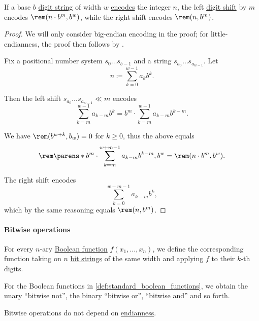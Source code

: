 \begin{proposition}\label{thm:digit_shift_arithmetic}
  If a base \( b \) \hyperref[def:positional_number_system]{digit string} of width \( w \) \hyperref[def:ring_of_unsigned_integers]{encodes} the integer \( n \), the left \hyperref[def:digit_shift]{digit shift} by \( m \) encodes \( \rem(n \cdot b^m, b^w) \), while the right shift encodes \( \rem(n, b^m) \).
\end{proposition}
\begin{proof}
  We will only consider big-endian encoding in the proof; for little-endianness, the proof then follows by .

  Fix a positional number system \( s_0 \ldots s_{b-1} \) and a string \( s_{a_0} \ldots s_{a_{w-1}} \). Let
  \begin{equation*}
    n \coloneqq \sum_{k=0}^{w-1} a_k b^k.
  \end{equation*}

  Then the left shift \( s_{a_0} \ldots s_{a_{w-1}} \ll m \) encodes
  \begin{equation*}
    \sum_{k=m}^{w-1} a_{k-m} b^k = b^m \cdot \sum_{k=m}^{w-1} a_{k-m} b^{k-m}.
  \end{equation*}

  We have \( \rem(b^{w+k}, b_w) = 0 \) for \( k \geq 0 \), thus the above equals
  \begin{equation*}
    \rem\parens*{ b^m \cdot \sum_{k=m}^{w+m-1} a_{k-m} b^{k-m}, b^w } = \rem(n \cdot b^m, b^w).
  \end{equation*}

  The right shift encodes
  \begin{equation*}
    \sum_{k=0}^{w-m-1} a_{k-m} b^k,
  \end{equation*}
  which by the same reasoning equals \( \rem(n, b^m) \).
\end{proof}

\paragraph{Bitwise operations}

\begin{definition}\label{def:bitwise_operations}
  For every \( n \)-ary \hyperref[def:boolean_function]{Boolean function} \( f(x_1, \ldots, x_n) \), we define the corresponding  function taking on \( n \) \hyperref[def:bit_string]{bit strings} of the same width and applying \( f \) to their \( k \)-th digits.
\end{definition}
\begin{comments}
  \item For the Boolean functions in \cref{def:standard_boolean_functions}, we obtain the unary \enquote{bitwise not}, the binary \enquote{bitwise or}, \enquote{bitwise and} and so forth.

  \item Bitwise operations do not depend on \hyperref[def:endianness]{endianness}.
\end{comments}


